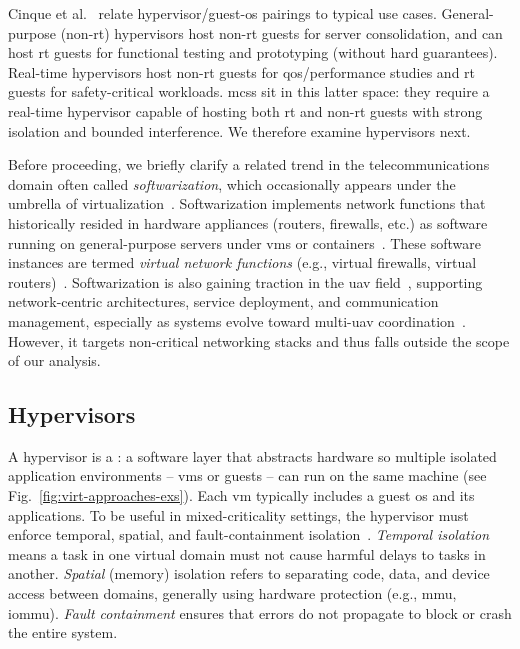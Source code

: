 Cinque et al.~\cite{cinque2022virtualizing} relate hypervisor/guest-\gls{os}
pairings to typical use cases. General-purpose (non-\gls{rt}) hypervisors host
non-\gls{rt} guests for server consolidation, and can host \gls{rt} guests for
functional testing and prototyping (without hard guarantees). Real-time
hypervisors host non-\gls{rt} guests for \gls{qos}/performance studies and \gls{rt}
guests for safety-critical workloads. \glspl{mcs} sit in this latter space: they
require a real-time hypervisor capable of hosting both \gls{rt} and non-\gls{rt}
guests with strong isolation and bounded interference. We therefore examine
hypervisors next.

Before proceeding, we briefly clarify a related trend in the telecommunications
domain often called \emph{softwarization}, which occasionally appears under the
umbrella of virtualization~\cite{pathak_uav_2020,liu_deep_2022,nogales_adaptable_2018}.
Softwarization implements network functions that historically resided in
hardware appliances (routers, firewalls, etc.) as software running on
general-purpose servers under \glspl{vm} or
containers~\cite{kumari_taxonomy_2020}. These software instances are termed
\emph{virtual network functions} (e.g., virtual firewalls, virtual
routers)~\cite{cotroneo_nfv-bench_2017}.
%
Softwarization is also gaining traction in the \gls{uav}
field~\cite{sara_softwarization_2016,pathak_uav_2020,siddiki_abir_software-defined_2023,oubbati2020softwarization},
supporting network-centric architectures, service deployment, and communication
management, especially as systems evolve toward multi-\gls{uav}
coordination~\cite{li_distributed_2024,azari_uav--uav_2020}. However, it targets
non-critical networking stacks and thus falls outside the scope of our analysis.

\subsection{Hypervisors}%
\label{sec:superv--hyperv}
A hypervisor is a : a software layer that abstracts hardware so
multiple isolated application environments -- \glspl{vm} or guests -- can run on
the same machine (see Fig.~\ref{fig:virt-approaches-exs}). Each \gls{vm}
typically includes a guest \gls{os} and its applications. To be useful in
mixed-criticality settings, the hypervisor must enforce temporal, spatial, and
fault-containment isolation~\cite{cinque2022virtualizing}. \emph{Temporal isolation} means a task in one
virtual domain must not cause harmful delays to tasks in another. \emph{Spatial}
(memory) isolation refers to separating code, data, and device access between
domains, generally using hardware protection (e.g., \gls{mmu}, \gls{iommu}). \emph{Fault
containment} ensures that errors do not propagate to block or crash the entire
system.

